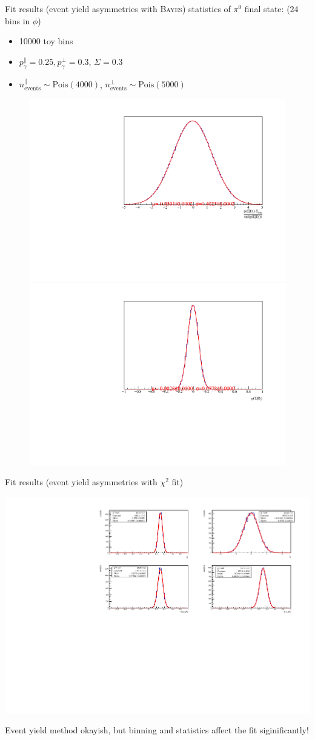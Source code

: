 \documentclass[11pt,aspectratio=169,dvipsnames]{beamer}
\begin{document}
		\begin{frame}{Fit results (event yield asymmetries with \textsc{Bayes})}
		statistics of $\pi^0$ final state: (24 bins in $\phi$)
		\begin{itemize}[label=$\blacktriangleright$]
			\item 10000 toy bins
			\item $p_\gamma^\parallel=0.25,p_\gamma^\bot=0.3$, $\Sigma=0.3$
			\item $n_\text{events}^\parallel\sim\text{Pois}(4000)$, $n_\text{events}^\bot\sim\text{Pois}(5000)$ 
		\end{itemize}
		\begin{figure}[htbp]
			\includegraphics[width=.49\linewidth]{../../bayes/toyMC/plots/pi0_combined_post_add.pdf}
			\includegraphics[width=.49\linewidth]{../../bayes/toyMC/plots/pi0_combined_post_add_raw.pdf}
		\end{figure}
		
	\end{frame}
		\begin{frame}{Fit results (event yield asymmetries with $\chi^2$ fit)}
		\begin{center}
			\includegraphics[width=.9\linewidth]{../../bayes/toyMC/plots/pi0_chi2.pdf}
		\end{center}
		
		
		Event yield method okayish, but binning and statistics affect the fit siginificantly!	
		
	\end{frame}
\end{document}
